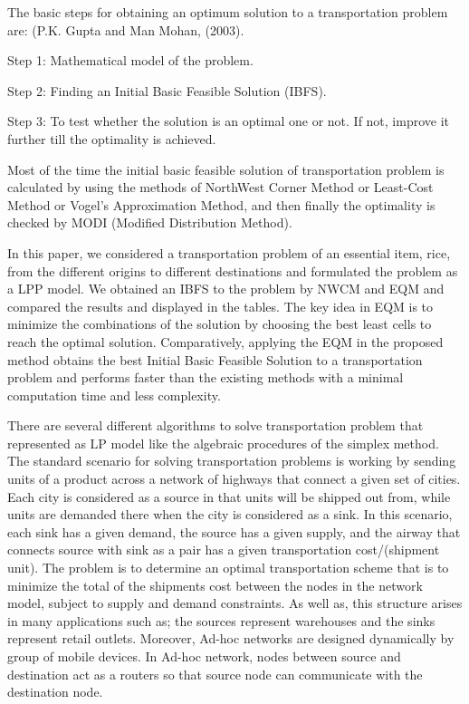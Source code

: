 \documentclass{article}
\begin{document}
{The basic steps for obtaining an optimum solution to a transportation problem are: (P.K. Gupta and Man Mohan, (2003).

Step 1: Mathematical model of the problem.

Step 2: Finding an Initial Basic Feasible Solution (IBFS).

Step 3: To test whether the solution is an optimal one or not. If not, improve it further till the optimality is achieved.

Most of the time the initial basic feasible solution of transportation problem is calculated by using the methods of NorthWest Corner Method or Least-Cost Method or Vogel’s Approximation Method, and then finally the optimality is checked by MODI (Modified Distribution Method).

In this paper, we considered a transportation problem of an essential item, rice, from the different origins to different destinations and formulated the problem as a LPP model. We obtained an IBFS to the problem by NWCM and EQM and compared the results and displayed in the tables. The key idea in EQM is to minimize the combinations of the solution by choosing the best least cells to reach the optimal solution. Comparatively, applying the EQM in the proposed method obtains the best Initial Basic Feasible Solution to a transportation problem and performs faster than the existing methods with a minimal computation time and less complexity.

There are several different algorithms to solve transportation problem that represented as LP model like the algebraic procedures of the simplex method. The standard scenario for solving transportation problems is working by sending units of a product across	a network of highways that connect a given set of cities. Each city is considered as a source in that units will be shipped out from, while units are demanded there when the city is considered as a sink. In this scenario, each sink has a given demand, the	source has a given supply, and the airway that connects source with sink as a pair has a given transportation cost/(shipment unit). The problem is to determine an optimal transportation scheme that is to minimize the total of the shipments cost between the nodes in the network model, subject to supply and demand constraints. As well as, this structure arises in many applications such as; the sources represent warehouses and the sinks represent retail outlets. Moreover, Ad-hoc networks are designed dynamically by group of mobile devices. In Ad-hoc network, nodes between source and destination act as a routers so that source node can communicate with the destination node.

}
\end{document}

